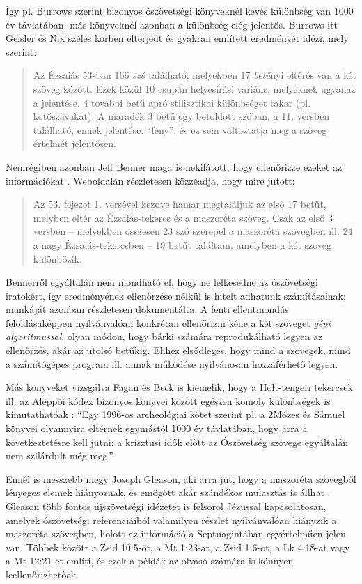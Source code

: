 \documentclass{article}
\begin{document}
Így pl. Burrows szerint \cite[304. o.]{Burrows} bizonyos ószövetségi könyveknél kevés különbség van 1000 év távlatában,
más könyveknél azonban a különbség elég jelentős. Burrows itt Geisler és Nix széles körben
elterjedt és gyakran említett eredményét idézi, mely szerint:
\begin{quote}
Az Ézsaiás 53-ban 166 \textit{szó}
található, melyekben 17 \textit{betű}nyi eltérés van a két szöveg között.
Ezek közül 10 csupán helyesírási variáns, melyeknek ugyanaz a jelentése.
4 további betű apró stilisztikai különbséget takar (pl. kötőszavakat).
A maradék 3 betű egy betoldott szóban, a 11. versben található, ennek jelentése: ``fény'',
és ez sem változtatja meg a szöveg értelmét jelentősen. \cite[263. o.]{GeislerNix}
\end{quote}
Nemrégiben azonban Jeff Benner maga is nekilátott, hogy ellenőrizze ezeket az információkat
\cite{Benner}. Weboldalán részletesen közzéadja, hogy mire jutott:
\begin{quote}Az 53. fejezet 1. versével kezdve hamar megtaláljuk az első 17 betűt,
melyben eltér az Ézsaiás-tekercs és a maszoréta szöveg. Csak az első 3 versben --
melyekben összesen 23 szó szerepel a maszoréta szövegben ill. 24 a nagy Ézsaiás-tekercsben --
19 betűt találtam, amelyben a két szöveg különbözik.
\end{quote}
Bennerről egyáltalán nem mondható el, hogy ne lelkesedne az ószövetségi iratokért,
így eredményének ellenőrzése nélkül is hitelt adhatunk számításainak; munkáját azonban
részletesen dokumentálta. A fenti ellentmondás
feloldásaképpen nyilvánvalóan konkrétan ellenőrizni kéne a két szöveget \textit{gépi algoritmussal},
olyan módon, hogy bárki számára reprodukálható legyen az ellenőrzés, akár az utolsó
betűkig. Ehhez elsődleges,
hogy mind a szövegek, mind a számítógépes program ill. annak működése nyilvánosan
hozzáférhető legyen.

Más könyveket vizsgálva Fagan és Beck is kiemelik, hogy 
a Holt-tengeri tekercsek ill. az Aleppói kódex bizonyos könyvei között egészen komoly különbségek is
kimutathatóak \cite{FaganBeck}: ``Egy 1996-os archeológiai kötet szerint pl. a 2Mózes és
Sámuel könyvei olyannyira eltérnek egymástól 1000 év távlatában, hogy
arra a következtetésre kell jutni: a krisztusi idők előtt az Ószövetség
szövege egyáltalán nem szilárdult még meg.''

Ennél is messzebb megy Joseph Gleason, aki arra jut, hogy a maszoréta szövegből lényeges
elemek hiányoznak, és emögött akár szándékos mulasztás is állhat \cite{Gleason}.
Gleason több fontos újszövetségi idézetet is felsorol Jézussal kapcsolatosan, amelyek ószövetségi
referenciáiból valamilyen
részlet nyilvánvalóan hiányzik a maszoréta szövegben, holott az információ a Septuagintában
egyértelműen jelen van. Többek között a Zsid 10:5-öt, a Mt 1:23-at, a Zsid 1:6-ot, a Lk 4:18-at
vagy a Mt 12:21-et említi, és ezek a példák az olvasó számára is könnyen leellenőrizhetőek.
\end{document}
